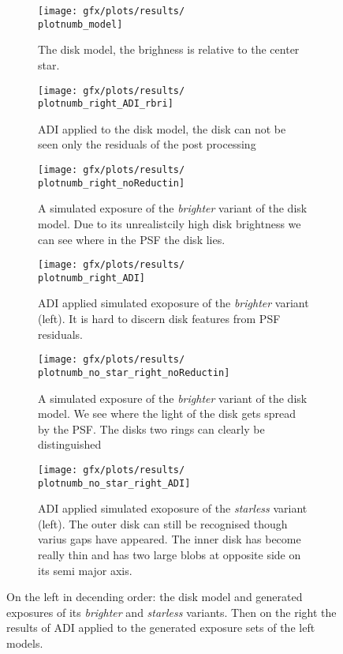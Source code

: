 \begin{figure}[h!]
  \newcommand{\plotnumb}{7}
  \begin{subfigure}[t]{0.6\textwidth}
    \texttt{[image: gfx/plots/results/\\plotnumb\_model]}
    \caption{The disk model, the brighness is relative to the center star.}
  \end{subfigure}%
  \begin{subfigure}[t]{0.6\textwidth}
    \texttt{[image: gfx/plots/results/\\plotnumb\_right\_ADI\_rbri]}
    \caption{\ac{ADI} applied to the disk model, the disk can not be seen only the residuals of the post processing}
  \end{subfigure}
  
  \begin{subfigure}[t]{0.6\textwidth}
    \texttt{[image: gfx/plots/results/\\plotnumb\_right\_noReductin]}
    \caption{A simulated exposure of the \textit{brighter} variant of the disk model. Due to its unrealistcily high disk brightness we can see where in the \ac{PSF} the disk lies.}
  \end{subfigure}%
  \begin{subfigure}[t]{0.6\textwidth}
    \texttt{[image: gfx/plots/results/\\plotnumb\_right\_ADI]}
    \caption{\ac{ADI} applied simulated exoposure of the \textit{brighter} variant (left). It is hard to discern disk features from \ac{PSF} residuals.}
  \end{subfigure}
  
  \begin{subfigure}[t]{0.6\textwidth}
    \centering
    \texttt{[image: gfx/plots/results/\\plotnumb\_no\_star\_right\_noReductin]}
    \caption{A simulated exposure of the \textit{brighter} variant of the disk model. We see where the light of the disk gets spread by the PSF. The disks two rings can clearly be distinguished}
  \end{subfigure}%
  \begin{subfigure}[t]{0.6\textwidth}
    \centering
    \texttt{[image: gfx/plots/results/\\plotnumb\_no\_star\_right\_ADI]}
    \caption{\ac{ADI} applied simulated exoposure of the \textit{starless} variant (left). The outer disk can still be recognised though varius gaps have appeared. The inner disk has become really thin and has two large blobs at opposite side on its semi major axis.}
  \end{subfigure}


  \caption{On the left in decending order: the disk model and generated exposures of its \textit{brighter} and \textit{starless} variants. Then on the right the results of \ac{ADI} applied to the generated exposure sets of the left models.}
  \label{fig:A}
\end{figure}
